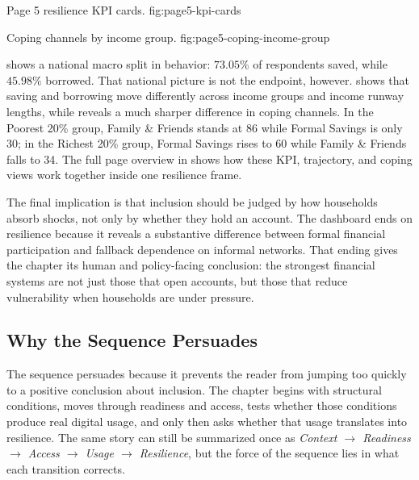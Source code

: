 \documentclass[../main.tex]{subfiles}
\begin{document}
{Page 5 resilience KPI cards.}
{fig:page5-kpi-cards}

{Coping channels by income group.}
{fig:page5-coping-income-group}

 shows a national
macro split in behavior:
\(73.05\%\) of respondents saved, while \(45.98\%\) borrowed. That national
picture is not the endpoint, however. 
shows that saving and borrowing move differently across income groups and income
runway lengths, while 
reveals a much sharper difference in coping channels. In the Poorest 20\%
group, Family \& Friends stands at 86 while Formal Savings is only 30; in the
Richest 20\% group, Formal Savings rises to 60 while Family \& Friends falls
to 34. The full page overview in 
shows how these KPI,
trajectory, and coping views work together inside one resilience frame.

The final implication is that inclusion should be judged by how households
absorb shocks, not only by whether they hold an account. The dashboard ends on
resilience because it reveals a substantive difference between formal financial
participation and fallback dependence on informal networks. That ending gives
the chapter its human and policy-facing conclusion: the strongest financial
systems are not just those that open accounts, but those that reduce
vulnerability when households are under pressure.

\subsection{Why the Sequence Persuades}
\label{subsec:story-structure}

The sequence persuades because it prevents the reader from jumping too quickly
to a positive conclusion about inclusion. The chapter begins with structural
conditions, moves through readiness and access, tests whether those conditions
produce real digital usage, and only then asks whether that usage translates
into resilience. The same story can still be summarized once as
\textit{Context \(\rightarrow\) Readiness \(\rightarrow\) Access \(\rightarrow\)
Usage \(\rightarrow\) Resilience}, but the force of the sequence lies in what
each transition corrects.
\end{document}
